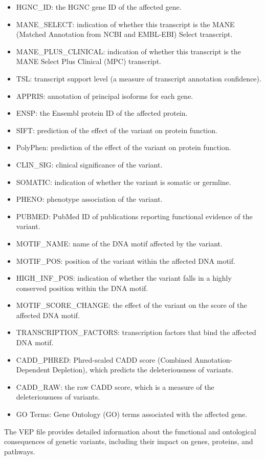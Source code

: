 \documentclass[12pt,a4paper]{article}
\begin{document}
\begin{itemize}
\item HGNC\_ID: the HGNC gene ID of the affected gene.
\item MANE\_SELECT: indication of whether this transcript is the MANE (Matched Annotation from NCBI and EMBL-EBI) Select transcript.
\item MANE\_PLUS\_CLINICAL: indication of whether this transcript is the MANE Select Plus Clinical (MPC) transcript.
\item TSL: transcript support level (a measure of transcript annotation confidence).
\item APPRIS: annotation of principal isoforms for each gene.
\item ENSP: the Ensembl protein ID of the affected protein.
\item SIFT: prediction of the effect of the variant on protein function.
\item PolyPhen: prediction of the effect of the variant on protein function.
\item CLIN\_SIG: clinical significance of the variant.
\item SOMATIC: indication of whether the variant is somatic or germline.
\item PHENO: phenotype association of the variant.
\item PUBMED: PubMed ID of publications reporting functional evidence of the variant.
\item MOTIF\_NAME: name of the DNA motif affected by the variant.
\item MOTIF\_POS: position of the variant within the affected DNA motif.
\item HIGH\_INF\_POS: indication of whether the variant falls in a highly conserved position within the DNA motif.
\item MOTIF\_SCORE\_CHANGE: the effect of the variant on the score of the affected DNA motif.
\item TRANSCRIPTION\_FACTORS: transcription factors that bind the affected DNA motif.
\item CADD\_PHRED: Phred-scaled CADD score (Combined Annotation-Dependent Depletion), which predicts the deleteriousness of variants.
\item CADD\_RAW: the raw CADD score, which is a measure of the deleteriousness of variants.
\item GO Terms: Gene Ontology (GO) terms associated with the affected gene.

\end{itemize}

The VEP file provides detailed information about the functional and ontological consequences of genetic variants, including their impact on genes, proteins, and pathways.
\end{document}
